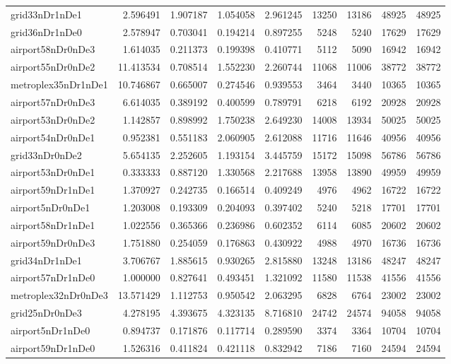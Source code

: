 \begin{longtable}{|l|r|r|r|r|r|r|r|r|}
grid33nDr1nDe1 & 2.596491 & 1.907187 & 1.054058 & 2.961245 & 13250 & 13186 & 48925 & 48925 \\
grid36nDr1nDe0 & 2.578947 & 0.703041 & 0.194214 & 0.897255 & 5248 & 5240 & 17629 & 17629 \\
airport58nDr0nDe3 & 1.614035 & 0.211373 & 0.199398 & 0.410771 & 5112 & 5090 & 16942 & 16942 \\
airport55nDr0nDe2 & 11.413534 & 0.708514 & 1.552230 & 2.260744 & 11068 & 11006 & 38772 & 38772 \\
metroplex35nDr1nDe1 & 10.746867 & 0.665007 & 0.274546 & 0.939553 & 3464 & 3440 & 10365 & 10365 \\
airport57nDr0nDe3 & 6.614035 & 0.389192 & 0.400599 & 0.789791 & 6218 & 6192 & 20928 & 20928 \\
airport53nDr0nDe2 & 1.142857 & 0.898992 & 1.750238 & 2.649230 & 14008 & 13934 & 50025 & 50025 \\
airport54nDr0nDe1 & 0.952381 & 0.551183 & 2.060905 & 2.612088 & 11716 & 11646 & 40956 & 40956 \\
grid33nDr0nDe2 & 5.654135 & 2.252605 & 1.193154 & 3.445759 & 15172 & 15098 & 56786 & 56786 \\
airport53nDr0nDe1 & 0.333333 & 0.887120 & 1.330568 & 2.217688 & 13958 & 13890 & 49959 & 49959 \\
airport59nDr1nDe1 & 1.370927 & 0.242735 & 0.166514 & 0.409249 & 4976 & 4962 & 16722 & 16722 \\
airport5nDr0nDe1 & 1.203008 & 0.193309 & 0.204093 & 0.397402 & 5240 & 5218 & 17701 & 17701 \\
airport58nDr1nDe1 & 1.022556 & 0.365366 & 0.236986 & 0.602352 & 6114 & 6085 & 20602 & 20602 \\
airport59nDr0nDe3 & 1.751880 & 0.254059 & 0.176863 & 0.430922 & 4988 & 4970 & 16736 & 16736 \\
grid34nDr1nDe1 & 3.706767 & 1.885615 & 0.930265 & 2.815880 & 13248 & 13186 & 48247 & 48247 \\
airport57nDr1nDe0 & 1.000000 & 0.827641 & 0.493451 & 1.321092 & 11580 & 11538 & 41556 & 41556 \\
metroplex32nDr0nDe3 & 13.571429 & 1.112753 & 0.950542 & 2.063295 & 6828 & 6764 & 23002 & 23002 \\
grid25nDr0nDe3 & 4.278195 & 4.393675 & 4.323135 & 8.716810 & 24742 & 24574 & 94058 & 94058 \\
airport5nDr1nDe0 & 0.894737 & 0.171876 & 0.117714 & 0.289590 & 3374 & 3364 & 10704 & 10704 \\
airport59nDr1nDe0 & 1.526316 & 0.411824 & 0.421118 & 0.832942 & 7186 & 7160 & 24594 & 24594 \\

\end{longtable}
